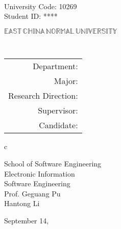 \newpage

\pagestyle{empty}

\\
\hspace*{\fill} {\large University Code: 10269}\\
\hspace*{\fill} {\large Student ID: \ifnotanonymous {\stuID} \else *****\fi}

\vskip 2cm

\begin{center}
    {\Huge $\mathbb{EAST}\,\mathbb{CHINA}\,\mathbb{NORMAL}\,
            \mathbb{UNIVERSITY}$}
\end{center}

\vskip 3cm

\begin{center}
    \bfseries{\scshape{\huge {\thesisETitle}}} \\
\end{center}

\vskip 2cm

{\large
\begin{center}
\begin{tabular}{r}
    Department:         \\
    Major:              \\
    Research Direction: \\
    Supervisor:         \\
    Candidate:
\end{tabular}
\begin{tabular}c

    School of Software Engineering \\
    \hline Electronic Information \\
    \hline Software Engineering  \\
    \hline Prof. Geguang Pu  \\
    \hline Hantong Li \\


    \hline
\end{tabular}
\end{center}
}


\vskip 2.5cm  

\begin{center}
    {\Large September 14, \year}
\end{center}
